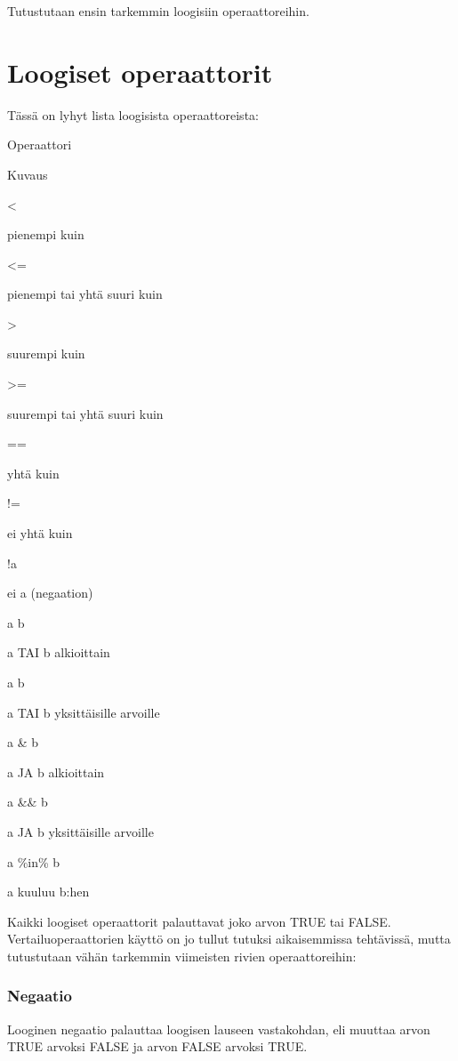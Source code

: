 \documentclass[
]{book}
\begin{document}
Tutustutaan ensin tarkemmin loogisiin operaattoreihin.

\hypertarget{loogiset-operaattorit}{%
\section{Loogiset operaattorit}\label{loogiset-operaattorit}}

Tässä on lyhyt lista loogisista operaattoreista:

Operaattori

Kuvaus

\textless{}

pienempi kuin

\textless=

pienempi tai yhtä suuri kuin

\textgreater{}

suurempi kuin

\textgreater=

suurempi tai yhtä suuri kuin

==

yhtä kuin

!=

ei yhtä kuin

!a

ei a (negaation)

a \textbar{} b

a TAI b alkioittain

a \textbar\textbar{} b

a TAI b yksittäisille arvoille

a \& b

a JA b alkioittain

a \&\& b

a JA b yksittäisille arvoille

a \%in\% b

a kuuluu b:hen

Kaikki loogiset operaattorit palauttavat joko arvon TRUE tai FALSE. Vertailuoperaattorien käyttö on jo tullut tutuksi aikaisemmissa tehtävissä, mutta tutustutaan vähän tarkemmin viimeisten rivien operaattoreihin:

\hypertarget{negaatio}{%
\subsubsection{Negaatio}\label{negaatio}}

Looginen negaatio palauttaa loogisen lauseen vastakohdan, eli muuttaa arvon TRUE arvoksi FALSE ja arvon FALSE arvoksi TRUE.
\end{document}
